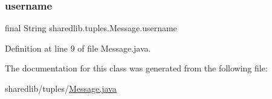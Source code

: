 \subsubsection{\texorpdfstring{username}{username}}
{\footnotesize\ttfamily final String sharedlib.\+tuples.\+Message.\+username}



Definition at line 9 of file Message.\+java.



The documentation for this class was generated from the following file\+:\begin{DoxyCompactItemize}
\item 
sharedlib/tuples/\hyperlink{_message_8java}{Message.\+java}\end{DoxyCompactItemize}
